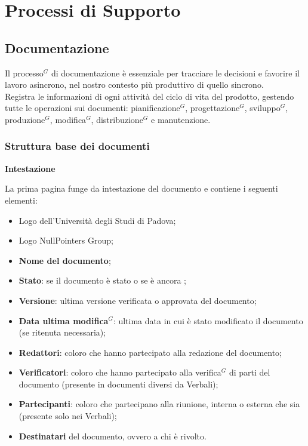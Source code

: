 \section{Processi di Supporto}
\subsection{Documentazione}
    Il processo$^G$ di documentazione è essenziale per tracciare le decisioni e favorire il lavoro asincrono, nel nostro contesto più produttivo di quello sincrono.\\
    Registra le informazioni di ogni attività del ciclo di vita del prodotto, gestendo tutte le operazioni sui documenti: pianificazione$^G$, progettazione$^G$, sviluppo$^G$, produzione$^G$, modifica$^G$, distribuzione$^G$ e manutenzione.

\subsubsection{Struttura base dei documenti}
\label{sec: struttura-base-doc}
\begin{center}
\textbf{Intestazione}
\end{center}
\vspace{-0.5em}
La prima pagina funge da intestazione del documento e contiene i seguenti elementi:
\begin{itemize}[itemsep=3pt, parsep=1pt, label=$\scriptstyle\bullet$]
        \item Logo dell'Università degli Studi di Padova;
        \item Logo NullPointers Group;
        \item \textbf{Nome del documento};
        \item \textbf{Stato}: se il documento è stato  o se è ancora ;
        \item \textbf{Versione}: ultima versione verificata o approvata del documento;
        \item \textbf{Data ultima modifica$^G$}: ultima data in cui è stato modificato il documento (se ritenuta necessaria);
        \item \textbf{Redattori}: coloro che hanno partecipato alla redazione del documento;
        \item \textbf{Verificatori}: coloro che hanno partecipato alla verifica$^G$ di parti del documento (presente in documenti diversi da Verbali);
        \item \textbf{Partecipanti}: coloro che partecipano alla riunione, interna o esterna che sia (presente solo nei Verbali);
        \item \textbf{Destinatari} del documento, ovvero a chi è rivolto.
    \end{itemize}

